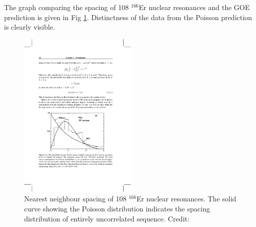 The graph comparing the spacing of  108 $^{166}$Er nuclear resonances and the GOE prediction is given in Fig \ref{fig:3}. Distinctness of the data from the Poisson prediction is clearly visible.
\begin{figure}[H]
\includegraphics[width=0.5\textwidth]{3}
\centering
\caption{Nearest neighbour spacing of 108 $^{166}$Er nuclear resonances. The solid curve showing the Poisson distribution indicates the spacing distribution of entirely uncorrelated sequence. Credit:\cite{ga61}}
\label{fig:3}
\end{figure}

